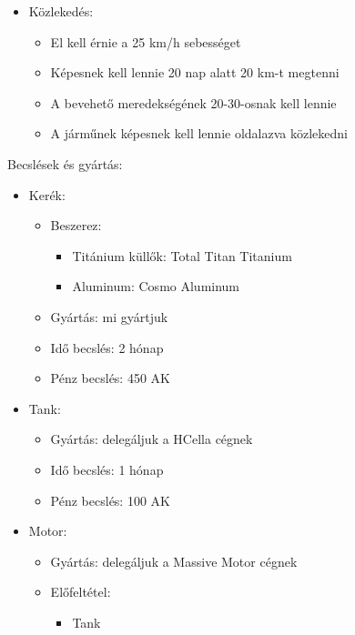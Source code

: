 \documentclass[12pt]{report}
\begin{document}
\begin{itemize}
\begin{itemize}
        \end{itemize}
    \item Közlekedés:
        \begin{itemize}
            \item El kell érnie a  25 km/h sebességet
            \item Képesnek kell lennie 20 nap alatt 20 km-t megtenni
            \item A bevehető meredekségének 20-30-osnak kell lennie
            \item A járműnek képesnek kell lennie oldalazva közlekedni
        \end{itemize}
\end{itemize}

Becslések és gyártás:

\begin{itemize}
    \item Kerék:
        \begin{itemize}
            \item Beszerez:
                \begin{itemize}
                    \item Titánium küllők: Total Titan Titanium
                    \item Aluminum: Cosmo Aluminum
                \end{itemize}
            \item Gyártás: mi gyártjuk
            \item Idő becslés: 2 hónap
            \item Pénz becslés: 450 AK
        \end{itemize}
    \item Tank:
        \begin{itemize}
            \item Gyártás: delegáljuk a HCella cégnek
            \item Idő becslés: 1 hónap
            \item Pénz becslés: 100 AK
        \end{itemize}
    \item Motor:
        \begin{itemize}
            \item Gyártás: delegáljuk a Massive Motor cégnek
            \item Előfeltétel: 
                \begin{itemize}
                    \item Tank
                \end{itemize}

\end{itemize}
\end{itemize}
\end{document}
